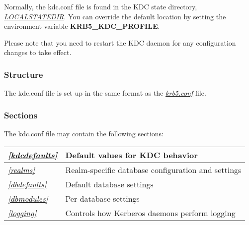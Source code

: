\documentclass[letterpaper,10pt,english]{sphinxmanual}
\begin{document}
Normally, the kdc.conf file is found in the KDC state directory,
{\hyperref[mitK5defaults:paths]{\emph{LOCALSTATEDIR}}}.  You can override the default location by setting the
environment variable \textbf{KRB5\_KDC\_PROFILE}.

Please note that you need to restart the KDC daemon for any configuration
changes to take effect.


\subsubsection{Structure}
\label{admin/conf_files/kdc_conf:structure}
The kdc.conf file is set up in the same format as the
{\hyperref[admin/conf_files/krb5_conf:krb5-conf-5]{\emph{krb5.conf}}} file.


\subsubsection{Sections}
\label{admin/conf_files/kdc_conf:sections}
The kdc.conf file may contain the following sections:

\begin{tabulary}{\linewidth}{|L|L|}
\hline

{\hyperref[admin/conf_files/kdc_conf:kdcdefaults]{\emph{{[}kdcdefaults{]}}}}
 & 
Default values for KDC behavior
\\
\hline
{\hyperref[admin/conf_files/kdc_conf:kdc-realms]{\emph{{[}realms{]}}}}
 & 
Realm-specific database configuration and settings
\\
\hline
{\hyperref[admin/conf_files/kdc_conf:dbdefaults]{\emph{{[}dbdefaults{]}}}}
 & 
Default database settings
\\
\hline
{\hyperref[admin/conf_files/kdc_conf:dbmodules]{\emph{{[}dbmodules{]}}}}
 & 
Per-database settings
\\
\hline
{\hyperref[admin/conf_files/kdc_conf:logging]{\emph{{[}logging{]}}}}
 & 
Controls how Kerberos daemons perform logging
\\
\hline\end{tabulary}
\end{document}
